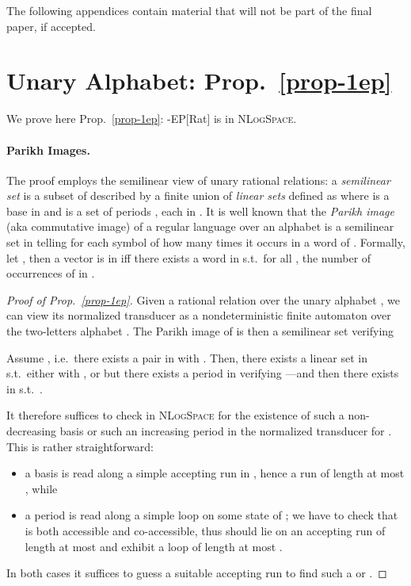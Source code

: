 \def\rightmark{Appendices}
\setcounter{page}{1}\renewcommand{}
\begin{vshort}
\noindent The following appendices contain material that will not be part of the
final paper, if accepted.
\end{vshort}

\section{Unary Alphabet: Prop.~\ref{prop-1ep}}\label{ax-1ep}

We prove here Prop.~\ref{prop-1ep}: -EP[Rat] is in
\textsc{NLogSpace}.

\paragraph{Parikh Images.}  The proof employs the semilinear view of
unary rational relations: a \emph{semilinear set}  is a subset of
 described by a finite union of \emph{linear sets}
 defined as  where  is a base in
 and  is a set of  periods
, each in .  It is well known that
the \emph{Parikh image} (aka commutative image)  of a regular
language  over an alphabet  is a semilinear set in
 telling for each symbol of  how many times it
occurs in a word of .  Formally, let ,
then a vector  is in  iff there exists a word  in
 s.t.\ for all ,  the number
of occurrences of  in .

\begin{proof}[Proof of Prop.~\ref{prop-1ep}]
Given a rational relation  over the unary alphabet ,
we can view its normalized transducer
 as a nondeterministic finite
automaton  over the two-letters
alphabet .  The Parikh
image of  is then a semilinear set
 verifying



Assume , i.e.\
there exists a pair  in  with .  Then, there exists
a linear set  in  s.t.\ either
 with , or  but there exists
a period  in  verifying ---and
then there exists  in  s.t.\ .

It therefore suffices to check in \textsc{NLogSpace} for the existence
of such a non-decreasing basis  or such an increasing period
 in the normalized transducer  for .  This is rather
straightforward:
\begin{itemize}
\item a basis  is read along a simple accepting
  run in , hence a run of length at most , while
\item a period  is read along a simple loop on some state 
  of ; we have to check that  is both accessible and
  co-accessible, thus  should lie on an accepting run of length at
  most  and exhibit a loop of length at most .
\end{itemize}
In both cases it suffices to guess a suitable accepting run to find
such a  or .
\end{proof}

